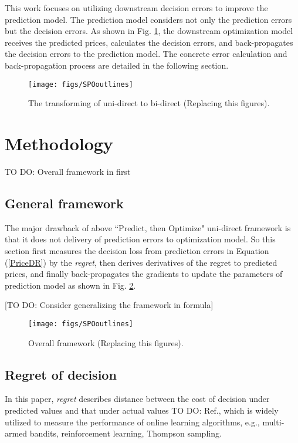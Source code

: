 \documentclass[journal]{IEEEtran}
\newcommand{\slw}{\color{blue}}
\begin{document}
This work focuses on utilizing downstream decision errors to improve the prediction model. The prediction model considers not only the prediction errors but the decision errors. As shown in Fig. \ref{transforming}, the downstream optimization model receives the predicted prices, calculates the decision errors, and back-propagates the decision errors to the prediction model. The concrete error calculation and back-propagation process are detailed in the following section.

\begin{figure}[ht]
  \centering
  \texttt{[image: figs/SPOoutlines]}
  \caption{The transforming of uni-direct to bi-direct (Replacing this figures).}
  \label{transforming}
\end{figure}

\section{Methodology}
{\slw TO DO: Overall framework in first}

\subsection{General framework}
The major drawback of above ``Predict, then Optimize" uni-direct framework is that it does not delivery of prediction errors to optimization model. So this section first measures the decision loss from prediction errors in Equation (\ref{PriceDR}) by the \textit{regret}, then derives derivatives of the regret to predicted prices, and finally back-propagates the gradients to update the parameters of prediction model as shown in Fig. \ref{SPO}.

{\slw [TO DO: Consider generalizing the framework in formula]}

\begin{figure}[ht]
  \centering
  \texttt{[image: figs/SPOoutlines]}
  \caption{Overall framework (Replacing this figures).}
  \label{SPO}
\end{figure}

\subsection{Regret of decision}
In this paper, \textit{regret} describes distance between the cost of decision under predicted values and that under actual values {\slw TO DO: Ref.}, which is widely utilized to measure the performance of online learning algorithms, e.g., multi-armed bandits, reinforcement learning, Thompson sampling.
\end{document}
